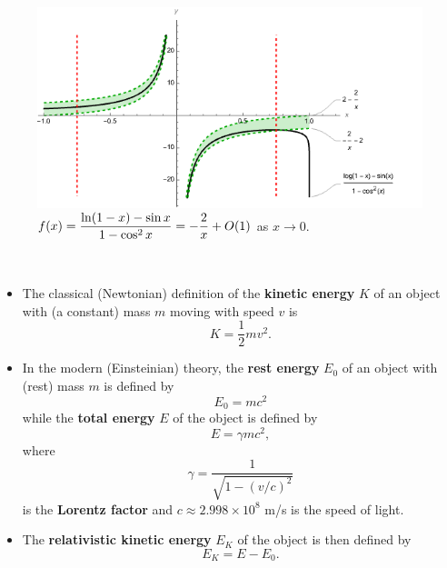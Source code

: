 \begin{figure}[H]
\includegraphics[width=6.5in]{img/power_series_and_limits2}
\caption{$f(x) =\displaystyle\frac{\ln(1-x)-\sin x}{1-\cos^2 x} = -\frac{2}{x} + O(1)$ as $x\to 0$.}
\end{figure}

\newpage

\begin{remark}\,
\begin{itemize}
\item The classical (Newtonian) definition of the \textbf{kinetic energy} $K$ of an object with (a constant) mass $m$ moving with speed $v$ is
\begin{equation*}
K= \frac{1}{2}mv^2.
\end{equation*}
\item In the modern (Einsteinian) theory, the \textbf{rest energy} $E_0$ of an object with (rest) mass $m$ is defined by
\begin{equation*}
E_0 = mc^2
\end{equation*}
while the \textbf{total energy} $E$ of the object is defined by
\begin{equation*}
E = \gamma mc^2,
\end{equation*}
where
\begin{equation*}
\gamma = \frac{1}{\sqrt{1-(v/c)^2}}
\end{equation*}
is the \textbf{Lorentz factor}
and $c\approx 2.998\times 10^8$ \si{m/s} is the speed of light.
\item The \textbf{relativistic kinetic energy} $E_K$ of the object is then defined by
\begin{equation*}
E_K = E-E_0.
\end{equation*}
\end{itemize}
\end{remark}


